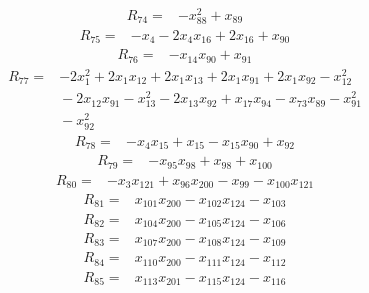 {\begin{align*}
\end{align*}
\begin{align*}
R_{74} ={}& -x_{88}^{2} + x_{89}
\end{align*}
\begin{align*}
R_{75} ={}& -x_{4} - 2x_{4} x_{16} + 2x_{16} + x_{90}
\end{align*}
\begin{align*}
R_{76} ={}& -x_{14} x_{90} + x_{91}
\end{align*}
\begin{align*}
R_{77} ={}& -2x_{1}^{2} + 2x_{1} x_{12} + 2x_{1} x_{13} + 2x_{1} x_{91} + 2x_{1} x_{92} - x_{12}^{2} \\
&{}  - 2x_{12} x_{91} - x_{13}^{2} - 2x_{13} x_{92} + x_{17} x_{94} - x_{73} x_{89} - x_{91}^{2} \\
&{}  - x_{92}^{2}
\end{align*}
\begin{align*}
R_{78} ={}& -x_{4} x_{15} + x_{15} - x_{15} x_{90} + x_{92}
\end{align*}
\begin{align*}
R_{79} ={}& -x_{95} x_{98} + x_{98} + x_{100}
\end{align*}
\begin{align*}
R_{80} ={}& -x_{3} x_{121} + x_{96} x_{200} - x_{99} - x_{100} x_{121}
\end{align*}
\begin{align*}
R_{81} ={}& x_{101} x_{200} - x_{102} x_{124} - x_{103}
\end{align*}
\begin{align*}
R_{82} ={}& x_{104} x_{200} - x_{105} x_{124} - x_{106}
\end{align*}
\begin{align*}
R_{83} ={}& x_{107} x_{200} - x_{108} x_{124} - x_{109}
\end{align*}
\begin{align*}
R_{84} ={}& x_{110} x_{200} - x_{111} x_{124} - x_{112}
\end{align*}
\begin{align*}
R_{85} ={}& x_{113} x_{201} - x_{115} x_{124} - x_{116}

\end{align*}}
